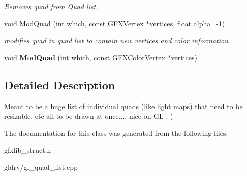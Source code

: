 \begin{DoxyCompactItemize}
\begin{DoxyCompactList}\small\item\em Removes quad from Quad list. \end{DoxyCompactList}\item 
void \hyperlink{classGFXQuadList_a85921ff68b8dc0a06b15a022d0518204}{Mod\+Quad} (int which, const \hyperlink{structGFXVertex}{G\+F\+X\+Vertex} $\ast$vertices, float alpha=-\/1)\hypertarget{classGFXQuadList_a85921ff68b8dc0a06b15a022d0518204}{}\label{classGFXQuadList_a85921ff68b8dc0a06b15a022d0518204}

\begin{DoxyCompactList}\small\item\em modifies quad in quad list to contain new vertices and color information \end{DoxyCompactList}\item 
void {\bfseries Mod\+Quad} (int which, const \hyperlink{structGFXColorVertex}{G\+F\+X\+Color\+Vertex} $\ast$vertices)\hypertarget{classGFXQuadList_a233d88906363229e81d35b0b699f6705}{}\label{classGFXQuadList_a233d88906363229e81d35b0b699f6705}

\end{DoxyCompactItemize}


\subsection{Detailed Description}
Meant to be a huge list of individual quads (like light maps) that need to be resizable, etc all to be drawn at once.... nice on GL \+:-\/) 

The documentation for this class was generated from the following files\+:\begin{DoxyCompactItemize}
\item 
gfxlib\+\_\+struct.\+h\item 
gldrv/gl\+\_\+quad\+\_\+list.\+cpp\end{DoxyCompactItemize}
